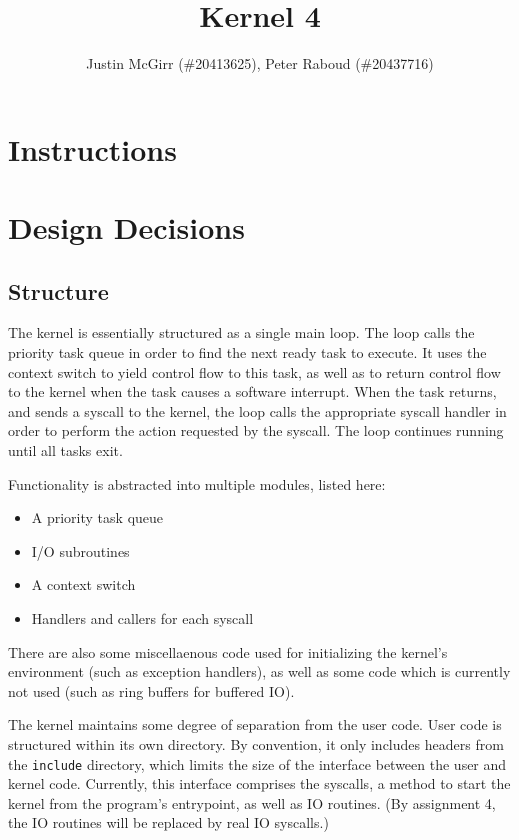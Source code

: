 \documentclass[titlepage]{article}
\begin{document}
\title{Kernel 4}
\author{Justin McGirr (\#20413625), Peter Raboud (\#20437716)}
\maketitle

\section{Instructions}


\section{Design Decisions}
\subsection{Structure}
The kernel is essentially structured as a single main loop.
The loop calls the priority task queue in order to find the next ready task
to execute.
It uses the context switch to yield control flow to this task, as well as to
return control flow to the kernel when the task causes a software interrupt.
When the task returns, and sends a syscall to the kernel, the loop calls
the appropriate syscall handler in order to perform the action requested by
the syscall.
The loop continues running until all tasks exit.

Functionality is abstracted into multiple modules, listed here:

\begin{itemize}
\item A priority task queue
\item I/O subroutines
\item A context switch
\item Handlers and callers for each syscall
\end{itemize}

There are also some miscellaenous code used for initializing the kernel's environment
(such as exception handlers), as well as some code which is currently not used (such
as ring buffers for buffered IO).

The kernel maintains some degree of separation from the user code.
User code is structured within its own directory.
By convention, it only includes headers from the \texttt{include} directory,
which limits the size of the interface between the user and kernel code.
Currently, this interface comprises the syscalls, a method to start the kernel from
the program's entrypoint, as well as IO routines.
(By assignment 4, the IO routines will be replaced by real IO syscalls.)
\end{document}
